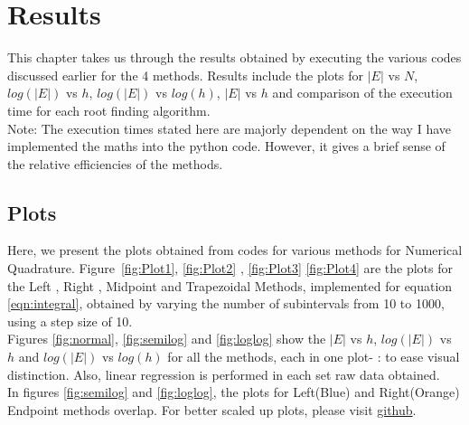 \documentclass[a4paper, 12pt]{report}
\begin{document}
\chapter{Results}
This chapter takes us through the results obtained by executing the various codes discussed earlier for the 4 methods. Results include the plots for $|E|$ vs $N$, $log(|E|)$ vs $h$, $log(|E|)$ vs $log(h)$, $|E|$ vs $h$ and comparison of the execution time for each root finding algorithm.\\
Note: The execution times stated here are majorly dependent on the way I have implemented the maths into the python code. However, it gives a brief sense of the relative efficiencies of the methods.
\section{Plots}
Here, we present the plots obtained from codes for various methods for Numerical Quadrature. Figure~\ref{fig:Plot1}, \ref{fig:Plot2} , \ref{fig:Plot3} \ref{fig:Plot4} are the plots for the Left , Right , Midpoint and Trapezoidal Methods, implemented for equation \ref{eqn:integral}, obtained by varying the number of subintervals from 10 to 1000, using a step size of 10.\\
Figures \ref{fig:normal}, \ref{fig:semilog} and \ref{fig:loglog} show the $|E|$ vs $h$, $log(|E|)$ vs $h$ and $log(|E|)$ vs $log(h)$ for all the methods, each in one plot- : to ease visual distinction. Also, linear regression is performed in each set raw data obtained.\\
In figures \ref{fig:semilog} and \ref{fig:loglog}, the plots for Left(Blue) and Right(Orange) Endpoint methods overlap. For better scaled up plots, please visit \href{https://github.com/YashIITM/Numerical-Quadrature}{github}.
\end{document}
